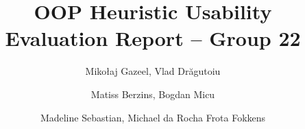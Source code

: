 \documentclass[sigconf]{acmart}
\title{OOP Heuristic Usability Evaluation Report -- Group 22}
\author{Mikołaj Gazeel, Vlad Drăgutoiu}
\author{Matiss Berzins, Bogdan Micu}
\author{Madeline Sebastian, Michael da Rocha Frota Fokkens}
\begin{document}
\begin{abstract}

\end{abstract}

\maketitle





% 



\end{document}
